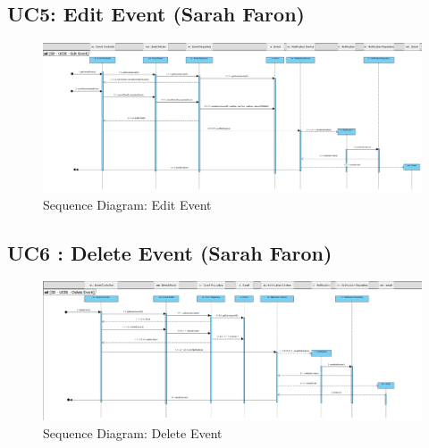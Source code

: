 \documentclass{article}
\begin{document}
\subsection{UC5: Edit Event (Sarah Faron)}
\begin{figure}[H]
    \centering
    \includegraphics[width=.9\textwidth]{images/SD-UC05-EditEvent.png}
    \centering
    \caption{Sequence Diagram: Edit Event}
\end{figure}
\subsection{UC6 : Delete Event (Sarah Faron)}
\begin{figure}[H]
    \centering
    \includegraphics[width=.9\textwidth]{images/SD-UC06-DeleteEvent.png}
    \centering
    \caption{Sequence Diagram: Delete Event}
\end{figure}
\end{document}
